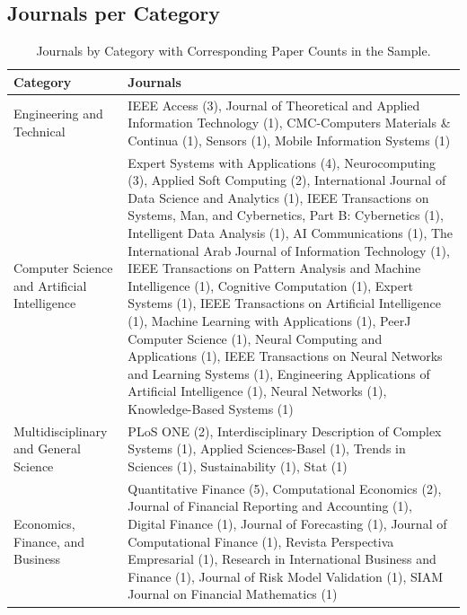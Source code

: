 \subsection{Journals per Category}
\label{appendix:journal_category_mapping}

\renewcommand{\thetable}{D\arabic{table}} %
\setcounter{table}{0} %

\begin{table}[H]
    \centering
    \caption[Journal Categories Mapping]{Journals by Category with Corresponding Paper Counts in the Sample.}
    \label{table:journal_categories}
    \small
    \begin{adjustbox}{width=1\textwidth,center}
    \begin{tabular}{p{} p{}}
        \toprule
        \textbf{Category} & \textbf{Journals} \\  
        \midrule
        Engineering and Technical & IEEE Access (3), Journal of Theoretical and Applied Information Technology (1), CMC-Computers Materials \& Continua (1), Sensors (1), Mobile Information Systems (1) \\
        \addlinespace
        \hdashline[0.2pt/3pt]
        \addlinespace
        Computer Science and Artificial Intelligence & Expert Systems with Applications (4), Neurocomputing (3), Applied Soft Computing (2), International Journal of Data Science and Analytics (1), IEEE Transactions on Systems, Man, and Cybernetics, Part B: Cybernetics (1), Intelligent Data Analysis (1), AI Communications (1), The International Arab Journal of Information Technology (1), IEEE Transactions on Pattern Analysis and Machine Intelligence (1), Cognitive Computation (1), Expert Systems (1), IEEE Transactions on Artificial Intelligence (1), Machine Learning with Applications (1), PeerJ Computer Science (1), Neural Computing and Applications (1), IEEE Transactions on Neural Networks and Learning Systems (1), Engineering Applications of Artificial Intelligence (1), Neural Networks (1), Knowledge-Based Systems (1) \\
        \addlinespace
        \hdashline[0.2pt/3pt]
        \addlinespace
        Multidisciplinary and General Science & PLoS ONE (2), Interdisciplinary Description of Complex Systems (1), Applied Sciences-Basel (1), Trends in Sciences (1), Sustainability (1), Stat (1) \\
        \addlinespace
        \hdashline[0.2pt/3pt]
        \addlinespace
        Economics, Finance, and Business & Quantitative Finance (5), Computational Economics (2), Journal of Financial Reporting and Accounting (1), Digital Finance (1), Journal of Forecasting (1), Journal of Computational Finance (1), Revista Perspectiva Empresarial (1), Research in International Business and Finance (1), Journal of Risk Model Validation (1), SIAM Journal on Financial Mathematics (1) \\

\end{tabular}
\end{adjustbox}
\end{table}
